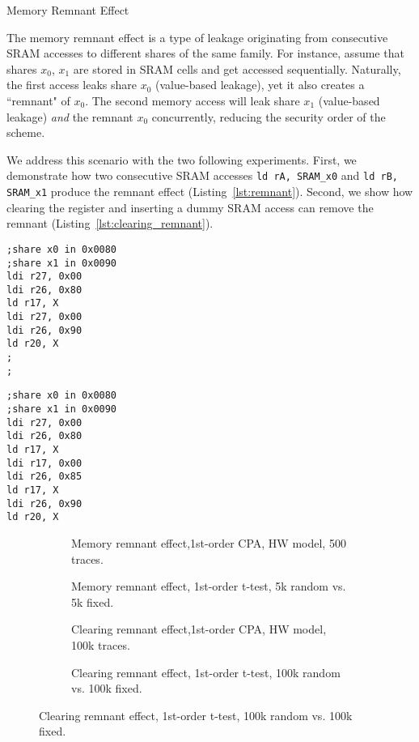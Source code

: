\begin{subsection}{Memory Remnant Effect} \label{mem_remnant}

The memory remnant effect is a type of leakage originating from consecutive SRAM accesses to different shares of the same family. For instance, assume that shares $x_0$, $x_1$ are stored in SRAM cells and get accessed sequentially. Naturally, the first access leaks share $x_0$ (value-based leakage), yet it also creates a ``remnant" of $x_0$. The second memory access will leak share $x_1$ (value-based leakage) \emph{and} the remnant $x_0$ concurrently, reducing the security order of the scheme.

We address this scenario with the two following experiments. First, we demonstrate how two consecutive SRAM accesses \texttt{ld rA, SRAM\_x0} and \texttt{ld rB, SRAM\_x1} produce the remnant effect (Listing~\ref{lst:remnant}). Second, we show how clearing the register and inserting a dummy SRAM access can remove the remnant (Listing~\ref{lst:clearing_remnant}).

\begin{minipage}{.45\textwidth}
\begin{lstlisting}
;share x0 in 0x0080
;share x1 in 0x0090
ldi r27, 0x00
ldi r26, 0x80
ld r17, X
ldi r27, 0x00
ldi r26, 0x90
ld r20, X
;
;
\end{lstlisting}
\end{minipage}\hfill
\begin{minipage}{.45\textwidth}
\begin{lstlisting}
;share x0 in 0x0080
;share x1 in 0x0090
ldi r27, 0x00
ldi r26, 0x80
ld r17, X
ldi r17, 0x00 
ldi r26, 0x85
ld r17, X
ldi r26, 0x90
ld r20, X
\end{lstlisting}
\end{minipage}

\begin{figure}[H]
\centering
\begin{subfigure}[b]{0.47\textwidth}
	\caption{\scriptsize{Memory remnant effect,1st-order CPA, HW model, 500 traces.}}
\end{subfigure}
\begin{subfigure}[b]{0.47\textwidth}
	\caption{\scriptsize{Memory remnant effect, 1st-order t-test, 5k random vs. 5k fixed.}}
\end{subfigure}
\begin{subfigure}[b]{0.47\textwidth}
	\caption{\scriptsize{Clearing remnant effect,1st-order CPA, HW model, 100k traces.}}
\end{subfigure}
\begin{subfigure}[b]{0.47\textwidth}
	\caption{\scriptsize{Clearing remnant effect, 1st-order t-test, 100k random vs. 100k fixed.}}
\end{subfigure}


\end{figure}
\end{subsection}
